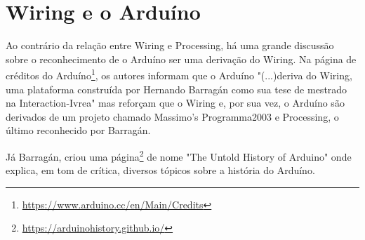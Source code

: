 \section{Wiring e o Arduíno}

Ao contrário da relação entre Wiring e Processing, há uma grande discussão sobre o reconhecimento de o Arduíno ser uma derivação do Wiring.
Na página de créditos do Arduíno\footnote{\url{https://www.arduino.cc/en/Main/Credits}}, os autores informam que o Arduíno "(...)deriva do Wiring, uma plataforma construída por Hernando Barragán como sua tese de mestrado na Interaction-Ivrea" mas reforçam que o Wiring e, por sua vez, o Arduíno são derivados de um projeto chamado Massimo's Programma2003 e Processing, o último reconhecido por Barragán. 

Já Barragán, criou uma página\footnote{\url{https://arduinohistory.github.io/}} de nome "The Untold History of Arduino" onde explica, em tom de crítica, diversos tópicos sobre a história do Arduíno.